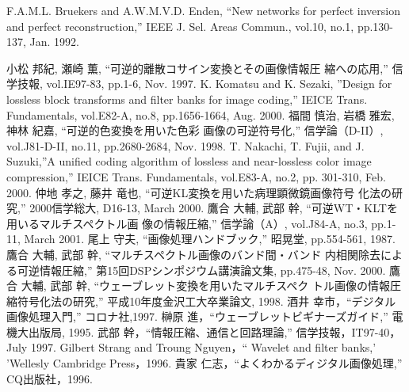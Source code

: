 \begin{thebibliography}{99}
F.A.M.L. Bruekers and A.W.M.V.D. Enden, ``New networks for
	perfect inversion and perfect reconstruction,'' IEEE
	J. Sel. Areas Commun., vol.10, no.1, pp.130-137,
	Jan. 1992. 

小松 邦紀, 瀬崎 薫, ``可逆的離散コサイン変換とその画像情報圧
	縮への応用,'' 信学技報, vol.IE97-83, pp.1-6, Nov. 1997.
K. Komatsu and K. Sezaki, ''Design for lossless block
	transforms and filter banks for image coding,'' IEICE
	Trans. Fundamentals, vol.E82-A, no.8, pp.1656-1664,
	Aug. 2000.
福間 慎治, 岩橋 雅宏, 神林 紀嘉, ``可逆的色変換を用いた色彩
	画像の可逆符号化,'' 信学論（D-II）, vol.J81-D-II, no.11, pp.2680-2684, Nov. 1998.
 T. Nakachi, T. Fujii, and J. Suzuki,''A unified coding
	algorithm of lossless and near-lossless color image
	compression,'' IEICE Trans. Fundamentals, vol.E83-A, no.2,
	pp. 301-310, Feb. 2000.
仲地 孝之, 藤井 竜也, ``可逆KL変換を用いた病理顕微鏡画像符号
	化法の研究,'' 2000信学総大, D16-13, March 2000.
鷹合 大輔, 武部 幹, ``可逆WT・KLTを用いるマルチスペクトル画
	像の情報圧縮,'' 信学論（A）, vol.J84-A, no.3, pp.1-11, March
	2001.
尾上 守夫, ``画像処理ハンドブック,'' 昭晃堂, pp.554-561, 1987.
鷹合 大輔, 武部 幹, ``マルチスペクトル画像のバンド間・バンド
	内相関除去による可逆情報圧縮,'' 第15回DSPシンポジウム講演論文集, pp.475-48, Nov.
	2000.
鷹合 大輔, 武部 幹, ``ウェーブレット変換を用いたマルチスペク
	トル画像の情報圧縮符号化法の研究,'' 平成10年度金沢工大卒業論文,
	1998.
酒井 幸市，``デジタル画像処理入門,'' コロナ社,1997.
榊原 進，``ウェーブレットビギナーズガイド,'' 電機大出版局,
	 1995.
武部 幹，``情報圧縮、通信と回路理論,'' 信学技報，IT97-40，July
	1997.
Gilbert Strang and Troung Nguyen，``
Wavelet and filter banks,' 'Wellesly Cambridge Press，1996.
貴家 仁志，``よくわかるディジタル画像処理,'' CQ出版社，1996.
 \end{thebibliography}
 
